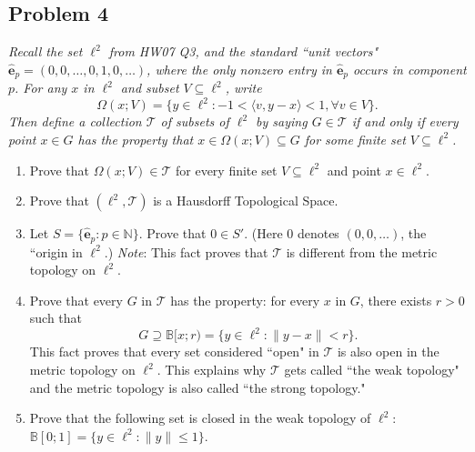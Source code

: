 \documentclass{article}
\newcommand{\N}{{\mathbb N}}
\begin{document}
\subsection*{Problem 4}
{\it Recall the set $\ell^2$ from HW07 Q3,
and the standard ``unit vectors" $\hat{\mathbf{e}}_p = (0,0,\dots,0,1,0,\dots)$,
where the only nonzero entry in $\hat{\mathbf{e}}_p$ occurs in component $p$.
For any $x$ in $\ell^2$ and subset $V \subseteq \ell^2$, write
\[
	\Omega(x;V) = \{y \in \ell^2 \colon -1 < \langle v,y-x\rangle<1, \forall v \in V\}.
\]
Then define a collection $\mathcal{T}$ of subsets of $\ell^2$ by saying
$G \in \mathcal{T}$ if and only if every point $x \in G$ has the property
that $x \in \Omega(x;V) \subseteq G$ for some \emph{finite set} $V \subseteq \ell^2$.
\begin{enumerate}
	\item Prove that $\Omega(x;V) \in \mathcal{T}$ for every finite set
		$V \subseteq \ell^2$ and point $x \in \ell^2$.
	\item Prove that $(\ell^2, \mathcal{T})$ is a Hausdorff Topological Space.
	\item Let $S = \{\hat{\mathbf{e}}_p \colon p \in \N\}$.
		Prove that $0 \in S'$.
		(Here $0$ denotes $(0,0,\dots)$, the ``origin in $\ell^2$.)
		\emph{Note}: This fact proves that $\mathcal{T}$ is
		different from the metric topology on $\ell^2$.
	\item Prove that every $G$ in $\mathcal{T}$ has the property:
		for every $x$ in $G$, there exists $r>0$ such that
		\[
			G \supseteq \mathbb{B}[x;r) = \{y \in \ell^2 \colon
			\lVert y - x \rVert < r\}.
		\]
		This fact proves that every set considered ``open" in $\mathcal{T}$
		is also open in the metric topology on $\ell^2$.
		This explains why $\mathcal{T}$ gets called ``the weak topology"
		and the metric topology is also called ``the strong topology."
	\item Prove that the following set is closed in the weak topology of $\ell^2$:
		$\mathbb{B}[0;1] = \{y \in \ell^2 \colon \lVert y \rVert \leq 1\}$.
\end{enumerate}}
\end{document}
